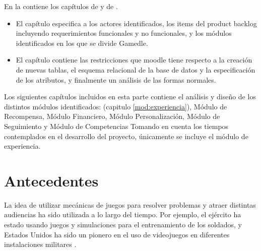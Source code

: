 \clearpage\noindent En la  contiene los capítulos de  y de .

\begin{itemize}
    \item El capítulo  especifica a los actores identificados, los items del product backlog incluyendo requerimientos funcionales y no funcionales, y los módulos identificados en los que se divide Gamedle.
    
    \item El capítulo  contiene las restricciones que moodle tiene respecto a la creación de nuevas tablas, el esquema relacional de la base de datos y la especificación de los atributos, y finalmente un análisis de las formas normales.
\end{itemize}

\noindent Los siguientes capítulos incluidos en esta parte contiene el análisis y diseño de los distintos módulos identificados: %
 (capitulo \ref*{mod:experiencia}), 
Módulo de Recompensa, 
Módulo Financiero, 
Módulo Personalización, 
Módulo de Seguimiento y 
Módulo de Competencias
\nolinebreak Tomando en cuenta los tiempos contemplados en el desarrollo del proyecto, únicamente se incluye el módulo de experiencia.

\clearpage


\section{Antecedentes}
\label{sec:antecedentes}

La idea de utilizar mecánicas de juegos para resolver problemas y atraer distintas audiencias ha sido utilizada a lo largo del tiempo. Por ejemplo, el ejército ha estado usando juegos y simulaciones para el entrenamiento de los soldados, y Estados Unidos ha sido un pionero en el uso de videojuegos en diferentes instalaciones militares \cite{GamByDesign}. %

